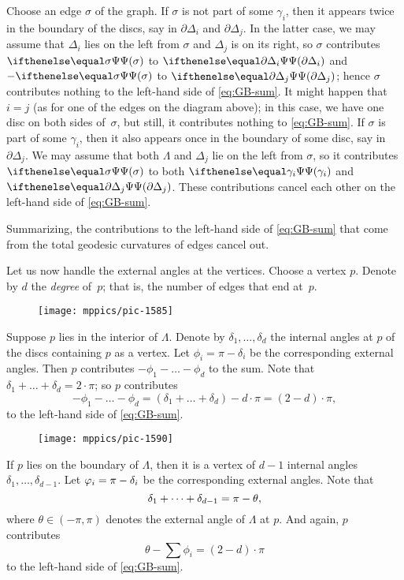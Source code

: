 Choose an edge $\sigma$ of the graph.
If $\sigma$ is not part of some $\gamma_i$,
then it appears twice in the boundary of the discs, say in  $\partial \Delta_i$ and $ \partial \Delta_j$. 
In the latter case, we may assume that $\Delta_i$ lies on the left from $\sigma$ and $\Delta_j$ is on its right, so 
 $\sigma$ contributes $\tgc\sigma$ to $\tgc{\partial\Delta_i}$ and $-\tgc\sigma$ to $\tgc{\partial\Delta_j}$; hence $\sigma$ contributes nothing to the left-hand side of \ref{eq:GB-sum}.
It might happen that $i=j$ (as for one of the edges on the diagram above);
in this case, we have one disc on both sides of~$\sigma$, but still, it contributes nothing to \ref{eq:GB-sum}.
If $\sigma$ is part of some $\gamma_i$, then it also appears once in the boundary of some disc, say in $\partial \Delta_j$.
We may assume that both $\Lambda$ and $\Delta_j$ lie on the left from $\sigma$,
so it contributes $\tgc\sigma$ to both $\tgc{\gamma_i}$ and $\tgc{\partial\Delta_j}$.
These contributions cancel each other on the left-hand side of  \ref{eq:GB-sum}.

Summarizing, the contributions to the left-hand side of  \ref{eq:GB-sum} that come from the total geodesic curvatures of edges cancel out.

Let us now handle the external angles at the vertices.
Choose a vertex $p$.
Denote by $d$ the \emph{degree} of~$p$;
that is, the number of edges that end at~$p$.

\begin{wrapfigure}{r}{23 mm}
\vskip-0mm
\centering
\texttt{[image: mppics/pic-1585]}
\end{wrapfigure}

Suppose $p$ lies in the interior of $\Lambda$.
Denote by $\delta_1,\dots,\delta_d$ the internal angles at $p$ of the discs containing $p$ as a vertex. 
Let  $\phi_{i}=\pi-\delta_{i}$ be the corresponding external angles.
Then $p$ contributes  
$-\phi_1-\dots-\phi_d$ to the sum.
Note that $\delta_1+\dots+\delta_d=2\cdot\pi$;
so $p$ contributes
\[-\phi_1-\dots-\phi_d = (\delta_1+\dots+\delta_d) - d\cdot \pi=(2-d)\cdot \pi,\]
to the left-hand side of \ref{eq:GB-sum}.

\begin{wrapfigure}{r}{23 mm}
\vskip-0mm
\centering
\texttt{[image: mppics/pic-1590]}
\end{wrapfigure}

If $p$ lies on the boundary of $\Lambda$, then it is a vertex of $d-1$ internal angles
$\delta_1,\dots,\delta_{d-1}$.
Let $\phi_{i}\z=\pi-\delta_{i}$ be the corresponding external angles.
Note that
\[\delta_1+\dots+\delta_{d-1}\z=\pi-\theta,\]
where $\theta\in(-\pi,\pi)$ denotes the external angle of $\Lambda$ at $p$.
And again, $p$ contributes
\[\theta-\sum\phi_{i}=(2-d)\cdot \pi\]
to the left-hand side of \ref{eq:GB-sum}.

